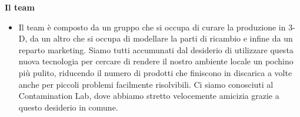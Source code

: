 \documentclass[hidelinks,aspectratio=169]{beamer}
\begin{document}
	\begin{frame}{\textbf{Il team}}
		\begin{itemize}
			\item Il team è composto da un gruppo che si occupa di curare la produzione in 3-D, da un altro che si occupa di modellare la parti di ricambio e infine da un reparto marketing. \newline Siamo tutti accumunati dal desiderio di utilizzare questa nuova tecnologia per cercare di rendere il nostro ambiente locale un pochino più pulito, riducendo il numero di prodotti che finiscono in discarica a volte anche per piccoli problemi facilmente risolvibili. \newline
			Ci siamo conosciuti al Contamination Lab, dove abbiamo stretto velocemente amicizia grazie a questo desiderio in comune. 
		\end{itemize}
	\end{frame}
\end{document}
